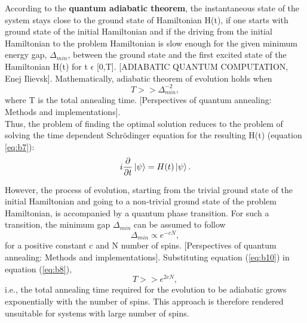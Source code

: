 \documentclass[12]{article}
\begin{document}
According to the \textbf{quantum adiabatic theorem}, the instantaneous state of the system stays close to the ground state of Hamiltonian H(t), if one starts with ground state of the initial Hamiltonian and if the driving from the initial Hamiltonian to the problem Hamiltonian is slow enough for the given minimum energy gap, $\Delta_{min}$, between the ground state and the first excited state of the Hamiltonian H(t) for t $\epsilon$ [0,T]. [ADIABATIC QUANTUM COMPUTATION, Enej Ilievsk]. Mathematically, adiabatic theorem of evolution holds when 
\begin{equation}
T>> {\Delta}_{min}^{-2}, \label{eq:b8}
\end{equation}
where T is the total annealing time. [Perspectives of quantum annealing: Methods and implementations].\\
Thus, the problem of finding the optimal solution reduces to the problem of solving the time dependent Schr{\"o}dinger equation for the resulting H(t) (equation \ref{eq:b7}):
\begin{equation}
i\frac{\partial}{\partial t}\ket{\psi}=H(t)\ket{\psi}.    \label{eq:b9}
\end{equation}

However, the process of evolution, starting from the trivial ground state of the initial Hamiltonian and going to a non-trivial ground state of the problem Hamiltonian, is accompanied by a quantum phase transition. For such a transition, the minimum gap $\Delta_{min}$ can be assumed to follow
\begin{equation}
\Delta_{min} \propto e^{-cN}, \label{eq:b10}
\end{equation}
for a positive constant c and N number of spins. [Perspectives of quantum annealing: Methods and implementations]. Substituting equation (\ref{eq:b10}) in equation (\ref{eq:b8}),
\begin{equation}
 T>> e^{2cN}, \label{eq:b11}
\end{equation}
i.e., the total annealing time required for the evolution to be adiabatic grows exponentially with the number of spins. This approach is therefore rendered unsuitable for systems with large number of spins.
\end{document}
